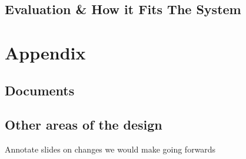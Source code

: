 \documentclass{article}
\begin{document}
\subsection{Evaluation \& How it Fits The System}\label{ssec:app-evaluation}


%
%
%


\printbibliography

\section{Appendix}\label{sec:appendix}
\subsection{Documents}\label{ssec:appendix-docs}
\subsection{Other areas of the design}\label{ssec:appendix-other}
Annotate slides on changes we would make going forwards
\end{document}
